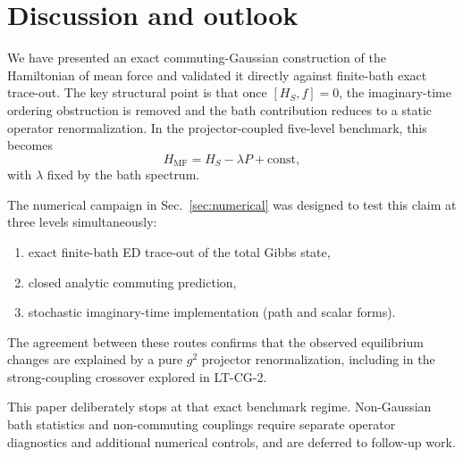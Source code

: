 \section{Discussion and outlook}
\label{sec:discussion}

We have presented an exact commuting-Gaussian construction of the Hamiltonian
of mean force and validated it directly against finite-bath exact trace-out.
The key structural point is that once $[H_S,f]=0$, the imaginary-time ordering
obstruction is removed and the bath contribution reduces to a static operator
renormalization. In the projector-coupled five-level benchmark, this becomes
\begin{equation}
H_{\mathrm{MF}}=H_S-\lambda P+\mathrm{const},
\end{equation}
with $\lambda$ fixed by the bath spectrum.

The numerical campaign in Sec.~\ref{sec:numerical} was designed to test this
claim at three levels simultaneously:
\begin{enumerate}
\item exact finite-bath ED trace-out of the total Gibbs state,
\item closed analytic commuting prediction,
\item stochastic imaginary-time implementation (path and scalar forms).
\end{enumerate}
The agreement between these routes confirms that the observed equilibrium
changes are explained by a pure $g^2$ projector renormalization, including in
the strong-coupling crossover explored in LT-CG-2.

This paper deliberately stops at that exact benchmark regime. Non-Gaussian bath
statistics and non-commuting couplings require separate operator diagnostics and
additional numerical controls, and are deferred to follow-up work.
